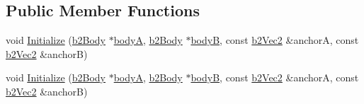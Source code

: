 \subsection*{Public Member Functions}
\begin{DoxyCompactItemize}
\item 
void \hyperlink{structb2DistanceJointDef_a99788a534638cc28cd1e44e0036503f0}{Initialize} (\hyperlink{classb2Body}{b2\+Body} $\ast$\hyperlink{structb2JointDef_a592b8e186f5f0d8848ef6b7ce77f0f70}{bodyA}, \hyperlink{classb2Body}{b2\+Body} $\ast$\hyperlink{structb2JointDef_a3d1a39831332b8c5a41611c06396480a}{bodyB}, const \hyperlink{structb2Vec2}{b2\+Vec2} \&anchorA, const \hyperlink{structb2Vec2}{b2\+Vec2} \&anchorB)
\item 
void \hyperlink{structb2DistanceJointDef_a99788a534638cc28cd1e44e0036503f0}{Initialize} (\hyperlink{classb2Body}{b2\+Body} $\ast$\hyperlink{structb2JointDef_a592b8e186f5f0d8848ef6b7ce77f0f70}{bodyA}, \hyperlink{classb2Body}{b2\+Body} $\ast$\hyperlink{structb2JointDef_a3d1a39831332b8c5a41611c06396480a}{bodyB}, const \hyperlink{structb2Vec2}{b2\+Vec2} \&anchorA, const \hyperlink{structb2Vec2}{b2\+Vec2} \&anchorB)
\end{DoxyCompactItemize}
